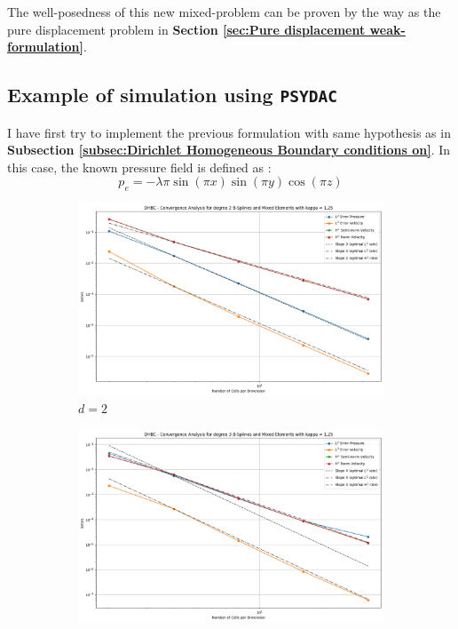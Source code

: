 \documentclass[a4paper,12pt,twoside]{report}
\begin{document}
The well-posedness of this new mixed-problem can be proven by the way as the pure displacement problem in \textbf{Section \ref{sec:Pure displacement weak-formulation}}.

\subsection{Example of simulation using \texttt{PSYDAC}}

I have first try to implement the previous formulation with same hypothesis as in \textbf{Subsection \ref{subsec:Dirichlet Homogeneous Boundary conditions on}}. In this case, the known pressure field is defined as : 
$$p_e = -\lambda \pi \sin(\pi x)\sin(\pi y)\cos(\pi z)$$


\begin{figure}[!h]
	\centering
	\begin{subfigure}[b]{0.49\textwidth}
		\centering
		\includegraphics[width=\textwidth]{convergence_degree_2_mixed_dirichlet_homogeneous_kappa=1.25}
		\caption{$d=2$}
		\label{fig:convergencedegree2mixeddirichlethomogeneouskappa1}
	\end{subfigure}
	\begin{subfigure}[b]{0.49\textwidth}
		\centering
		\includegraphics[width=\textwidth]{convergence_degree_3_mixed_dirichlet_homogeneous_kappa=1.25}

\end{subfigure}
\end{figure}
\end{document}
